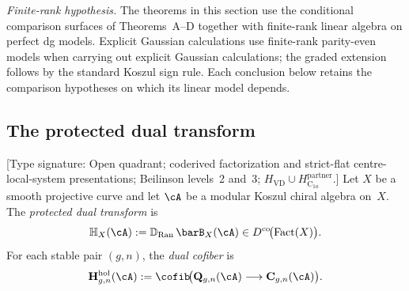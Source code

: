 \medskip
\noindent\emph{Finite-rank hypothesis.}\;
The theorems in this section use the conditional comparison surfaces
of Theorems~A--D together with finite-rank linear algebra on perfect
dg models.  Explicit Gaussian calculations use
finite-rank parity-even models when carrying out explicit Gaussian
calculations; the graded extension follows by the standard Koszul
sign rule.  Each conclusion below retains the comparison hypotheses
on which its linear model depends.

\subsection{The protected dual transform}
\label{subsec:holo-comp-protected-transform}

\begin{definition}
\label{def:holo-comp-protected-transform}
\textup{[Type signature: Open quadrant; coderived factorization and
strict-flat centre-local-system presentations; Beilinson levels~2
and~3; \(H_{\mathrm{VD}}\cup
H_{\mathrm C_{1a}}^{\mathrm{partner}}\).]}
Let $X$ be a smooth projective curve and let $\cA$ be a modular
Koszul chiral algebra on~$X$. The \emph{protected dual transform} is
\begin{equation}\label{eq:holo-comp-protected-transform}
\mathbb{H}_X(\cA)
:=
\mathbb{D}_{\operatorname{Ran}} \, \barB_X(\cA)
\in D^{\mathrm{co}}\!\bigl(\operatorname{Fact}(X)\bigr).
\end{equation}
For each stable pair \((g,n)\), the \emph{dual cofiber} is
\begin{equation}\label{eq:holo-comp-cofiber}
\mathbf{H}^{\mathrm{hol}}_{g,n}(\cA)
:=
\cofib\!\bigl(\mathbf{Q}_{g,n}(\cA)
\longrightarrow \mathbf{C}_{g,n}(\cA)\bigr).
\end{equation}
\end{definition}

